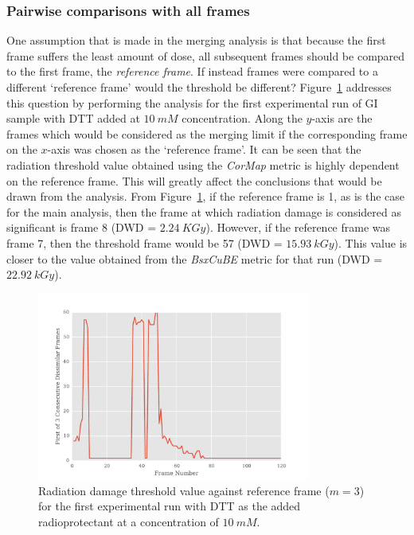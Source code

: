 \subsubsection{Pairwise comparisons with all frames}
\label{subs:Pairwise comparisons with all frames}
One assumption that is made in the merging analysis is that because the first frame suffers the least amount of dose, all subsequent frames should be compared to the first frame, the \textit{reference frame}.
If instead frames were compared to a different `reference frame' would the threshold be different?
Figure~\ref{fig:First n diff frames - DTT} addresses this question by performing the analysis for the first experimental run of GI sample with DTT added at $10\ mM$ concentration.
Along the $y$-axis are the frames which would be considered as the merging limit if the corresponding frame on the $x$-axis was chosen as the `reference frame'.
It can be seen that the radiation threshold value obtained using the \textit{CorMap} metric is highly dependent on the reference frame.
This will greatly affect the conclusions that would be drawn from the analysis.
From Figure~\ref{fig:First n diff frames - DTT}, if the reference frame is 1, as is the case for the main analysis, then the frame at which radiation damage is considered as significant is frame 8 (DWD = $2.24\ KGy$).
However, if the reference frame was frame 7, then the threshold frame would be 57 (DWD = $15.93\ kGy$).
This value is closer to the value obtained from the \textit{BsxCuBE} metric for that run (DWD = $22.92\ kGy$).
\begin{figure}
    \centering
    \includegraphics[width=0.8\textwidth]{figures/saxs/dtt_first_n_plot.pdf}
    \caption{Radiation damage threshold value against reference frame ($m = 3$) for the first experimental run with DTT as the added radioprotectant at a concentration of $10\ mM$.}
    \label{fig:First n diff frames - DTT}
\end{figure}

